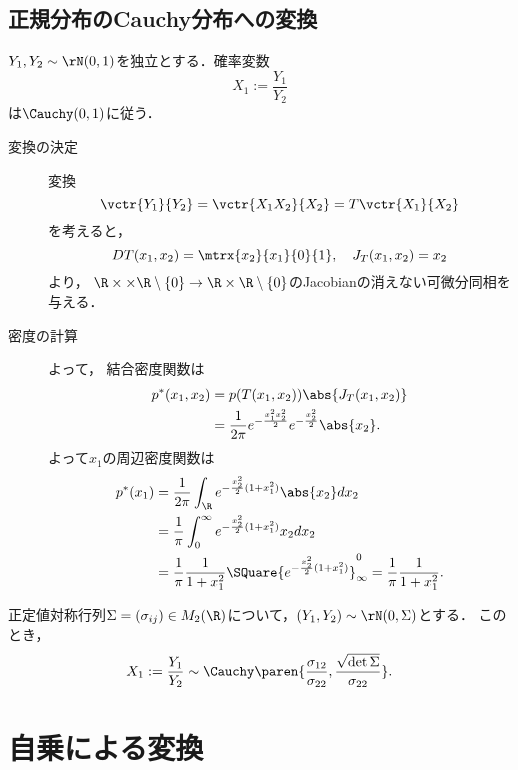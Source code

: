 \documentclass[uplatex,dvipdfmx]{jsreport}
\begin{document}
\subsection{正規分布のCauchy分布への変換}

\begin{proposition}
    $Y_1,Y_2\sim\rN(0,1)$を独立とする．確率変数
    \[X_1:=\frac{Y_1}{Y_2}\]
    は$\Cauchy(0,1)$に従う．
\end{proposition}
\begin{Proof}\mbox{}
    \begin{description}
        \item[変換の決定] 変換
        \[\vctr{Y_1}{Y_2}=\vctr{X_1X_2}{X_2}=T\vctr{X_1}{X_2}\]
        を考えると，
        \[DT(x_1,x_2)=\mtrx{x_2}{x_1}{0}{1},\quad J_T(x_1,x_2)=x_2\]
        より，
        $\R\times\times\R\setminus\{0\}\to\R\times\R\setminus\{0\}$のJacobianの消えない可微分同相を与える．
        \item[密度の計算] よって，
        結合密度関数は
        \begin{align*}
            p^*(x_1,x_2)&=p(T(x_1,x_2))\abs{J_T(x_1,x_2)}\\
            &=\frac{1}{2\pi}e^{-\frac{x_1^2x_2^2}{2}}e^{-\frac{x_2^2}{2}}\abs{x_2}.
        \end{align*}
        よって$x_1$の周辺密度関数は
        \begin{align*}
            p^*(x_1)&=\frac{1}{2\pi}\int_\R e^{-\frac{x_2^2}{2}(1+x_1^2)}\abs{x_2}dx_2\\
            &=\frac{1}{\pi}\int^\infty_0e^{-\frac{x_2^2}{2}(1+x_1^2)}x_2dx_2\\
            &=\frac{1}{\pi}\frac{1}{1+x_1^2}\SQuare{e^{-\frac{x_2^2}{2}(1+x_1^2)}}^0_{\infty}=\frac{1}{\pi}\frac{1}{1+x_1^2}.
        \end{align*}
    \end{description}
\end{Proof}

\begin{corollary}
    正定値対称行列$\Sigma=(\sigma_{ij})\in M_2(\R)$について，$(Y_1,Y_2)\sim\rN(0,\Sigma)$とする．
    このとき，
    \[X_1:=\frac{Y_1}{Y_2}\sim\Cauchy\paren{\frac{\sigma_{12}}{\sigma_{22}},\frac{\sqrt{\det\Sigma}}{\sigma_{22}}}.\]
\end{corollary}

\section{自乗による変換}
\end{document}
